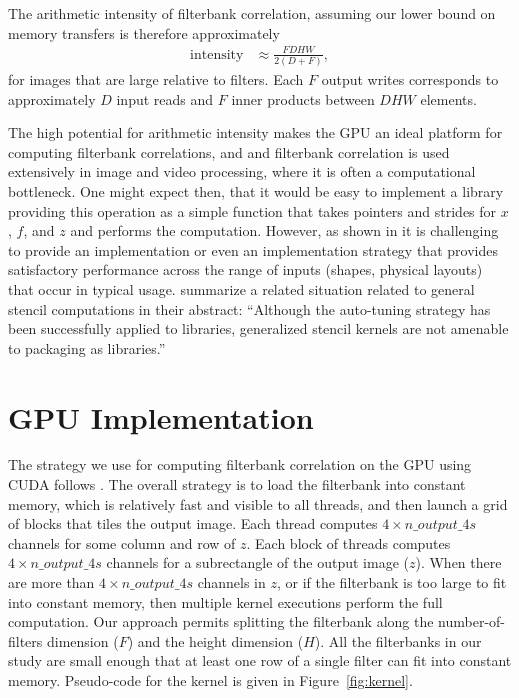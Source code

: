 \documentclass{sig-alternate}
\begin{document}
The arithmetic intensity of filterbank correlation, assuming our lower bound on memory transfers
is therefore approximately
\begin{align}
\mathrm{intensity} & \approx \frac {FDHW} {2(D+F)},
\end{align}
for images that are large relative to filters.
Each $F$ output writes corresponds to approximately $D$ input reads
and $F$ inner products between $DHW$ elements.

The high potential for arithmetic intensity makes the GPU an ideal platform for computing filterbank correlations,
and and filterbank correlation is used extensively in image and video processing,
where it is often a computational bottleneck.
One might expect then, that it would be easy to implement a library providing
this operation as a simple function that takes pointers and strides for $x$, $f$, and $z$ and performs the computation.
However, as shown in \citet{pinto+cox:2011gcg} 
it is challenging to provide an implementation
or even an implementation strategy that provides satisfactory performance
across the range of inputs (shapes, physical layouts) that occur in
typical usage.
\citet{kamil+etal:2009} summarize a related situation related to general stencil computations in their abstract:
``Although the auto-tuning strategy has been successfully applied to libraries,
generalized stencil kernels are not amenable to packaging as libraries.''



\section{GPU Implementation}
\label{sec:kernel}

The strategy we use for computing filterbank correlation on the GPU
using CUDA follows \citet{pinto+cox:2011gcg}.
The overall strategy is to load the filterbank into constant memory, which is
relatively fast and visible to all threads, and then launch a grid of blocks
that tiles the output image.
Each thread computes $4 \times n\_output\_4s$ channels for some column and row of $z$.
Each block of threads computes $4 \times n\_output\_4s$ channels for a subrectangle of the output image ($z$).
When there are more than $4 \times n\_output\_4s$ channels in $z$, or if the
filterbank is too large to fit into constant memory, then multiple
kernel executions perform the full computation.
Our approach permits splitting the filterbank along
the number-of-filters dimension ($F$) and the height dimension ($H$).
All the filterbanks in our study are small enough that
at least one row of a single filter can fit into constant memory.
Pseudo-code for the kernel is given in Figure~\ref{fig:kernel}.
\end{document}
